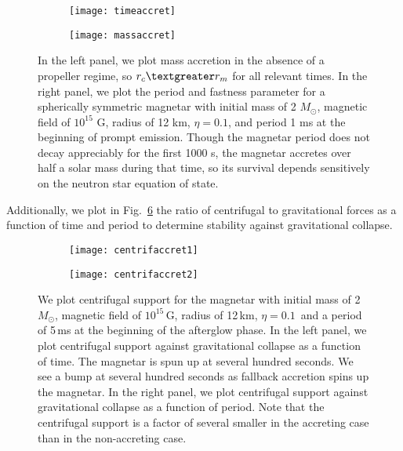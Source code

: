 \documentclass{article}
\begin{document}
\begin{figure}[h!]
\centering
\begin{subfigure}{.5\textwidth}
    \centering
    \texttt{[image: timeaccret]}
    \caption{}
    \label{fig:5a}
\end{subfigure}%
\begin{subfigure}{.5\textwidth}
    \centering
    \texttt{[image: massaccret]}
    \caption{}
    \label{fig:5b}
\end{subfigure}
\caption{In the left panel, we plot mass accretion in the absence of a propeller regime, so $r_c \textgreater r_m$ for all relevant times. In the right panel, we plot the period and fastness parameter for a spherically symmetric  magnetar with initial mass of 2 $M_{\odot}$, magnetic field of $10^{15}$ G, radius of 12 km, $\eta=0.1$,  and period 1 ms at the beginning of prompt emission. Though the magnetar period does not decay appreciably for the first 1000 s, the magnetar accretes over half a solar mass during that time, so its survival depends sensitively on the neutron star equation of state.}
\label{fig:5}
\end{figure}

Additionally, we plot in Fig.~\ref{fig:6} the ratio of centrifugal to gravitational forces as a function of time and period to determine stability against gravitational collapse.

\begin{figure}[h!]
\centering
\begin{subfigure}{.5\textwidth}
    \centering
    \texttt{[image: centrifaccret1]}
    \caption{}
    \label{fig:6a}
\end{subfigure}%
\begin{subfigure}{.5\textwidth}
    \centering
    \texttt{[image: centrifaccret2]}
    \caption{}
    \label{fig:6b}
\end{subfigure}
\caption{We plot centrifugal support for the magnetar with initial mass of 2 $M_{\odot}$, magnetic field of $10^{15}$\,G, radius of 12\,km, $\eta=0.1$\, and a period of 5\,ms at the beginning of the afterglow phase. In the left panel, we plot centrifugal support against gravitational collapse as a function of time. The magnetar is spun up at several hundred seconds. We see a bump at several hundred seconds as fallback accretion spins up the magnetar. In the right panel, we plot centrifugal support against gravitational collapse as a function of period. Note that the centrifugal support is a factor of several smaller in the accreting case than in the non-accreting case.}
\label{fig:6}
\end{figure}
\end{document}

